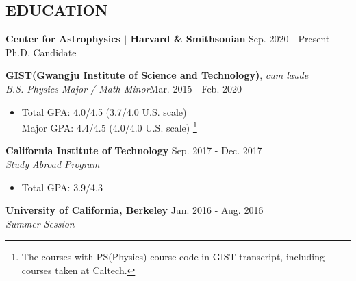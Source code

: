 \documentclass[margin, 10pt]{res} %
\begin{document}
\begin{resume}

 
\section{EDUCATION}  
{\bf Center for Astrophysics $\vert$ Harvard \& Smithsonian} \hfill Sep. 2020 - Present\\
Ph.D. Candidate

{\bf GIST(Gwangju Institute of Science and Technology)}, {\sl cum laude} \\
{\sl B.S. Physics Major / Math Minor}\hfill Mar. 2015 - Feb. 2020
\begin{itemize}
\small\item[] Total GPA: 4.0/4.5 (3.7/4.0 U.S. scale)\\
Major GPA: 4.4/4.5 (4.0/4.0 U.S. scale) \footnote{The courses with PS(Physics) course code in GIST transcript, including courses taken at Caltech.}
\end{itemize}

{\bf California Institute of Technology}  \hfill Sep. 2017 - Dec. 2017 \\
{\sl Study Abroad Program}
\begin{itemize}
\small\item[] Total GPA: 3.9/4.3
\begin{comment}
Ph127a Statistical Mechanics,\\
Ph77a Advanced Physics Laboratory,\\
ACM116 Introduction to Probability Models,\\
Ay20 Basic Astronomy and the Galaxy,\\
Ph103 Atomic and Molecular Physics(audit), Ph125a Quantum Mechanics(audit)
\end{comment}
\end{itemize}

{\bf University of California, Berkeley}  \hfill Jun. 2016 - Aug. 2016 \\
{\sl Summer Session}
\begin{comment}
\begin{itemize}
\small\item[] Chemical Structure and Reactivity\\
The Beauty and Joy of Computing
\end{itemize}
\end{comment}


\end{resume}
\end{document}
